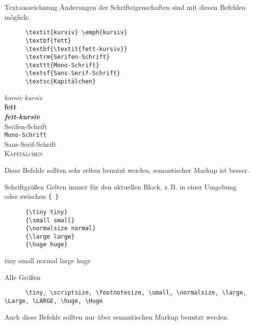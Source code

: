 \begin{frame}[fragile]{Textauszeichnung}
  Änderungen der Schrifteigenschaften sind mit diesen Befehlen möglich:
  \begin{CodeExample}{0.60}
    \begin{lstlisting}
      \textit{kursiv} \emph{kursiv}
      \textbf{fett}
      \textbf{\textit{fett-kursiv}}
      \textrm{Serifen-Schrift}
      \texttt{Mono-Schrift}
      \textsf{Sans-Serif-Schrift}
      \textsc{Kapitälchen}
    \end{lstlisting}
  \CodeResult
    \textit{kursiv} \emph{kursiv} \\
    \textbf{fett} \\
    \textbf{\textit{fett-kursiv}} \\
    \textrm{Serifen-Schrift} \\
    \texttt{Mono-Schrift} \\
    \textsf{Sans-Serif-Schrift} \\
    \textsc{Kapitälchen}
  \end{CodeExample}

  \vspace{1em}
  Diese Befehle sollten sehr selten benutzt werden, semantischer Markup ist besser.
\end{frame}

\begin{frame}[fragile]{Schriftgrößen}
  Gelten immer für den aktuellen Block, z.\,B. in einer Umgebung oder zwischen \lstinline+{ }+
  \begin{CodeExample}{0.48}
    \begin{lstlisting}
      {\tiny tiny}
      {\small small}
      {\normalsize normal}
      {\large large}
      {\huge huge}
    \end{lstlisting}
  \CodeResult
    {\tiny tiny}
    {\small small}
    {\normalsize normal}
    {\large large}
    {\huge huge}
  \end{CodeExample}
  \vspace{1em}
  \begin{block}{Alle Größen}
    \begin{lstlisting}
      \tiny, \scriptsize, \footnotesize, \small, \normalsize, \large, \Large, \LARGE, \huge, \Huge
    \end{lstlisting}
  \end{block}
  Auch diese Befehle sollten nur über semantischen Markup benutzt werden.
\end{frame}


